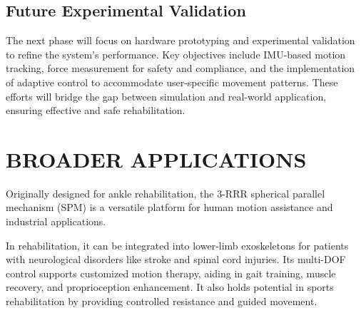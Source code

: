\documentclass[letterpaper, 10 pt, conference]{ieeeconf}  %
\begin{document}
\subsection{Future Experimental Validation}
The next phase will focus on hardware prototyping and experimental validation to refine the system’s performance. Key objectives include IMU-based motion tracking, force measurement for safety and compliance, and the implementation of adaptive control to accommodate user-specific movement patterns. These efforts will bridge the gap between simulation and real-world application, ensuring effective and safe rehabilitation.

\section{BROADER APPLICATIONS}




Originally designed for ankle rehabilitation, the 3-RRR spherical parallel mechanism (SPM) is a versatile platform for human motion assistance and industrial applications.

In rehabilitation, it can be integrated into lower-limb exoskeletons\cite{exoskeleton_stroke} for patients with neurological disorders like stroke and spinal cord injuries. Its multi-DOF control supports customized motion therapy, aiding in gait training, muscle recovery, and proprioception enhancement\cite{sale2012use}. It also holds potential in sports rehabilitation by providing controlled resistance and guided movement.
\end{document}
